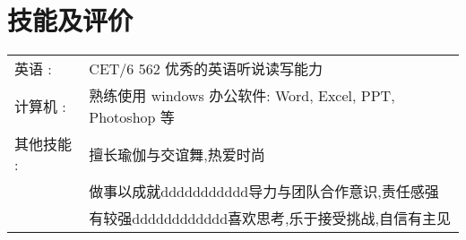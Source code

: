 \documentclass[a4paper]{article} %
\begin{document}
\section{技能及评价}

\begin{tabular}{ll}

英语 :
 &CET/6 562 \hspace{2em}  优秀的英语听说读写能力\\

 计算机 :
 &熟练使用 windows 办公软件: Word, Excel, PPT, Photoshop 等\\

 其他技能 :
 &擅长瑜伽与交谊舞,热爱时尚\\
 &做事以成就ddddddddddd导力与团队合作意识,责任感强\\
 &有较强dddddddddddd喜欢思考,乐于接受挑战,自信有主见\\


\end{tabular}
\end{document}
